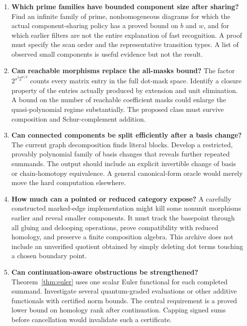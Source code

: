 \begin{enumerate}[label=\textbf{Q\arabic*.},leftmargin=*]
\item \textbf{Which prime families have bounded component size after sharing?}
Find an infinite family of prime, nonhomogeneous diagrams for which the
actual component-sharing policy has a proved bound on $b$ and $w$, and for
which earlier filters are not the entire explanation of fast recognition.
A proof must specify the scan order and the representative transition types.
A list of observed small components is useful evidence but not the result.

\item \textbf{Can reachable morphisms replace the all-masks bound?}
The factor $2^{s^2 2^{w/2}}$ counts every matrix entry in the full dot-mask
space. Identify a closure property of the entries actually produced by
extension and unit elimination. A bound on the number of reachable
coefficient masks could enlarge the quasi-polynomial regime substantially.
The proposed class must survive composition and Schur-complement addition.

\item \textbf{Can connected components be split efficiently after a basis
change?} The current graph decomposition finds literal blocks. Develop a
restricted, provably polynomial family of basis changes that reveals further
repeated summands. The output should include an explicit invertible change
of basis or chain-homotopy equivalence. A general canonical-form oracle
would merely move the hard computation elsewhere.

\item \textbf{How much can a pointed or reduced category expose?}
A carefully constructed marked-edge implementation might kill some
nonunit morphisms earlier and reveal smaller components. It must track the
basepoint through all gluing and delooping operations, prove compatibility
with reduced homology, and preserve a finite composition algebra. This
archive does not include an unverified quotient obtained by simply deleting
dot terms touching a chosen boundary point.

\item \textbf{Can continuation-aware obstructions be strengthened?}
Theorem~\ref{thm:euler} uses one scalar Euler functional for each completed
summand. Investigate several quantum-graded evaluations or other additive
functionals with certified norm bounds. The central requirement is a proved
lower bound on homology rank after continuation. Capping signed sums before
cancellation would invalidate such a certificate.


\end{enumerate}
